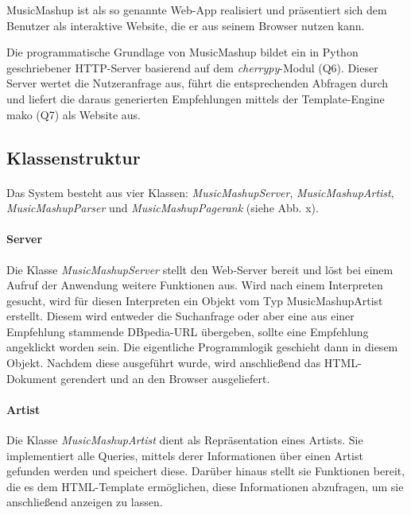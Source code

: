 MusicMashup ist als so genannte Web-App realisiert und präsentiert sich dem Benutzer als interaktive Website, die er aus seinem Browser nutzen kann.

Die programmatische Grundlage von MusicMashup bildet ein in Python geschriebener 
HTTP-Server basierend auf dem \textit{cherrypy}-Modul (Q6). Dieser Server wertet die Nutzeranfrage aus, führt die entsprechenden Abfragen durch und liefert die daraus generierten Empfehlungen mittels der Template-Engine mako (Q7) als Website aus. 

\subsection{Klassenstruktur}


\paragraph{}Das System besteht aus vier Klassen: \textit{MusicMashupServer}, \textit{MusicMashupArtist}, \textit{MusicMashupParser} und \textit{MusicMashupPagerank} (siehe Abb. x).



\paragraph{Server} Die Klasse \textit{MusicMashupServer} stellt den Web-Server bereit und löst bei einem Aufruf der Anwendung weitere Funktionen aus. Wird nach einem Interpreten gesucht, wird für diesen Interpreten ein Objekt vom Typ MusicMashupArtist erstellt. Diesem wird entweder die Suchanfrage oder aber eine aus einer Empfehlung stammende DBpedia-URL übergeben, sollte eine Empfehlung angeklickt worden sein. Die eigentliche Programmlogik geschieht dann in diesem Objekt. Nachdem diese ausgeführt wurde, wird anschließend das HTML-Dokument gerendert und an den Browser ausgeliefert.


\paragraph{Artist} Die Klasse \textit{MusicMashupArtist} dient als Repräsentation eines Artists. Sie implementiert alle Queries, mittels derer Informationen über einen Artist gefunden werden und speichert diese. Darüber hinaus stellt sie Funktionen bereit, die es dem HTML-Template ermöglichen, diese Informationen abzufragen, um sie anschließend anzeigen zu lassen.


